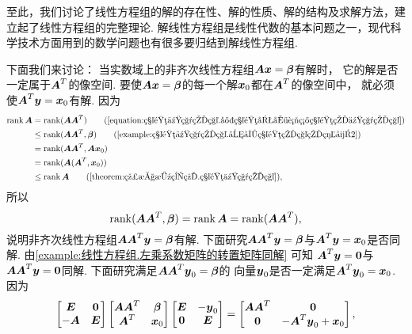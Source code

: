 至此，我们讨论了线性方程组的解的存在性、解的性质、解的结构及求解方法，建立起了线性方程组的完整理论.
解线性方程组是线性代数的基本问题之一，现代科学技术方面用到的数学问题也有很多要归结到解线性方程组.

\begingroup
下面我们来讨论：
当实数域上的非齐次线性方程组\(\boldsymbol{A} \boldsymbol{x} = \boldsymbol\beta\)有解时，
它的解是否一定属于\(\boldsymbol{A}^T\)的像空间.
要使\(\boldsymbol{A} \boldsymbol{x} = \boldsymbol\beta\)的每一个解\(\boldsymbol{x}_0\)都在\(\boldsymbol{A}^T\)的像空间中，
就必须使\(\boldsymbol{A}^T \boldsymbol{y} = \boldsymbol{x}_0\)有解.
因为\begin{align*}
	\rank\vb{A}
	&= \rank(\vb{A} \vb{A}^T)
		\tag{\cref{equation:矩阵乘积的秩.实矩阵及其转置矩阵的乘积的秩}} \\
	&\leq \rank(\vb{A} \vb{A}^T,\vb\beta)
		\tag{\cref{example:矩阵乘积的秩.分块矩阵的秩的等式2}} \\
	&= \rank(\vb{A} \vb{A}^T,\vb{A} \vb{x}_0) \\
	&= \rank(\vb{A} (\vb{A}^T,\vb{x}_0)) \\
	&\leq \rank\vb{A}
		\tag{\cref{theorem:线性方程组.矩阵乘积的秩}},
\end{align*}
所以\begin{equation}\label{equation:非齐次线性方程组的解集的结构.非齐次线性方程组的解是否属于它的系数矩阵的行空间.中间步骤1}
	\rank(\boldsymbol{A} \boldsymbol{A}^T,\boldsymbol\beta)
	= \rank\boldsymbol{A}
	= \rank(\boldsymbol{A} \boldsymbol{A}^T),
\end{equation}
说明非齐次线性方程组\(\boldsymbol{A} \boldsymbol{A}^T \boldsymbol{y} = \boldsymbol\beta\)有解.
下面研究\(\boldsymbol{A} \boldsymbol{A}^T \boldsymbol{y} = \boldsymbol\beta\)与\(\boldsymbol{A}^T \boldsymbol{y} = \boldsymbol{x}_0\)是否同解.
由\cref{example:线性方程组.左乘系数矩阵的转置矩阵同解} 可知
\(\boldsymbol{A}^T \boldsymbol{y} = \boldsymbol0\)与\(\boldsymbol{A} \boldsymbol{A}^T \boldsymbol{y} = \boldsymbol0\)同解.
下面研究满足\(\boldsymbol{A} \boldsymbol{A}^T \boldsymbol{y}_0 = \boldsymbol\beta\)的
向量\(\boldsymbol{y}_0\)是否一定满足\(\boldsymbol{A}^T \boldsymbol{y}_0 = \boldsymbol{x}_0\).
因为\begin{gather*}
	\begin{bmatrix}
		\boldsymbol{E} & \boldsymbol0 \\
		-\boldsymbol{A} & \boldsymbol{E}
	\end{bmatrix}
	\begin{bmatrix}
		\boldsymbol{A} \boldsymbol{A}^T & \boldsymbol\beta \\
		\boldsymbol{A}^T & \boldsymbol{x}_0
	\end{bmatrix}
	\begin{bmatrix}
		\boldsymbol{E} & -\boldsymbol{y}_0 \\
		\boldsymbol0 & \boldsymbol{E}
	\end{bmatrix}
	= \begin{bmatrix}
		\boldsymbol{A} \boldsymbol{A}^T & \boldsymbol0 \\
		\boldsymbol0 & -\boldsymbol{A}^T \boldsymbol{y}_0 + \boldsymbol{x}_0
	\end{bmatrix},
\end{gather*}
